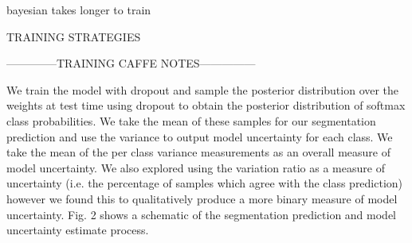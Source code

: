 bayesian takes longer to train

TRAINING STRATEGIES

--------------TRAINING CAFFE NOTES---------------

We train the model with dropout and sample the posterior distribution over the weights at test time using dropout
to obtain the posterior distribution of softmax class probabilities. We take the mean of these samples for our segmentation prediction and use the variance to output model
uncertainty for each class. We take the mean of the per class
variance measurements as an overall measure of model uncertainty. We also explored using the variation ratio as
a measure of uncertainty (i.e. the percentage of samples
which agree with the class prediction) however we found
this to qualitatively produce a more binary measure of
model uncertainty. Fig. 2 shows a schematic of the segmentation prediction and model uncertainty estimate process.